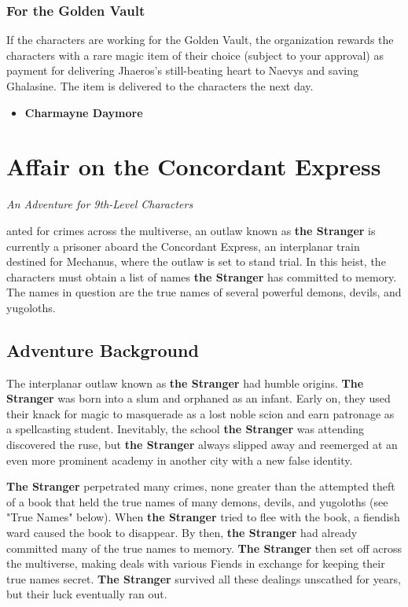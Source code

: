\documentclass[10pt,a4paper,twoside,bg=print,twocolumn,openany,nodeprecatedcode]{dndbook}
\begin{document}
\subsection{For the Golden Vault}
If the characters are working for the Golden Vault, the organization rewards the characters with a rare magic item of their choice (subject to your approval) as payment for delivering Jhaeros's still-beating heart to Naevys and saving Ghalasine. The item is delivered to the characters the next day.


\begin{itemize}
\item \textbf{Charmayne Daymore}
\end{itemize}

\chapter{Affair on the Concordant Express}
\textit{An Adventure for 9th-Level Characters}

anted for crimes across the multiverse, an outlaw known as \textbf{the Stranger} is currently a prisoner aboard the Concordant Express, an interplanar train destined for Mechanus, where the outlaw is set to stand trial. In this heist, the characters must obtain a list of names \textbf{the Stranger} has committed to memory. The names in question are the true names of several powerful demons, devils, and yugoloths.


\section{Adventure Background}
The interplanar outlaw known as \textbf{the Stranger} had humble origins. \textbf{The Stranger} was born into a slum and orphaned as an infant. Early on, they used their knack for magic to masquerade as a lost noble scion and earn patronage as a spellcasting student. Inevitably, the school \textbf{the Stranger} was attending discovered the ruse, but \textbf{the Stranger} always slipped away and reemerged at an even more prominent academy in another city with a new false identity.

\textbf{The Stranger} perpetrated many crimes, none greater than the attempted theft of a book that held the true names of many demons, devils, and yugoloths (see "True Names" below). When \textbf{the Stranger} tried to flee with the book, a fiendish ward caused the book to disappear. By then, \textbf{the Stranger} had already committed many of the true names to memory. \textbf{The Stranger} then set off across the multiverse, making deals with various Fiends in exchange for keeping their true names secret. \textbf{The Stranger} survived all these dealings unscathed for years, but their luck eventually ran out.
\end{document}
